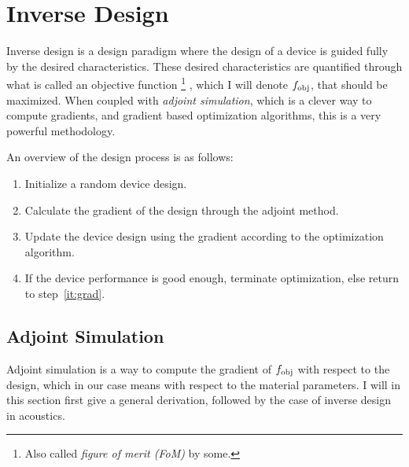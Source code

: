 



\section{Inverse Design}

Inverse design is a design paradigm where the design of a device is guided fully by
the desired characteristics.
These desired characteristics are quantified through what is called an objective
function%
\footnote{
	Also called \emph{figure of merit (FoM)} by some.%
}%
, which I will denote $f_\text{obj}$,
that should be maximized.
When coupled with \emph{adjoint simulation}, which is a clever way to compute
gradients, and gradient based optimization
algorithms, this is a very powerful methodology.

An overview of the design process is as follows:
\begin{enumerate}
	\item Initialize a random device design.
	\item\label{it:grad} Calculate the gradient of the design through the adjoint method.
	\item Update the device design using the gradient according to the optimization algorithm.
	\item If the device performance is good enough, terminate optimization, else
		return to step~\ref{it:grad}.
\end{enumerate}

\subsection{Adjoint Simulation}

Adjoint simulation is a way to compute the gradient of $f_\text{obj}$ with respect to
the design, which in our case means with respect to the material parameters.
I will in this section first give a general derivation, followed by the case of
inverse design in acoustics.

